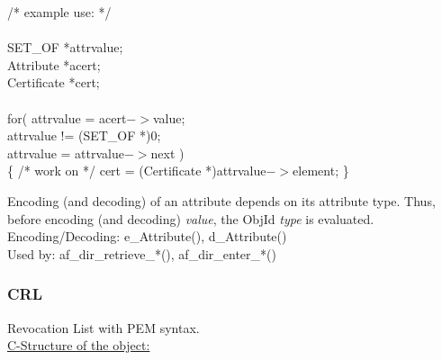 {\small
\btab
\1 /* example use: */   \\ \\
\2      SET\_OF     \2   *attrvalue; \\
\2      Attribute   \2   *acert;     \\
\2      Certificate \2   *cert;      \\ \\
\2      for( attrvalue = acert$->$value;  \\
\3         attrvalue != (SET\_OF *)0;  \\
\3         attrvalue = attrvalue$->$next ) \\
\2         \{ /* work on */ cert = (Certificate *)attrvalue$->$element; \} \\
\etab
}

Encoding (and decoding) of an attribute depends on its attribute type.
Thus, before encoding (and decoding) {\em value},
the ObjId {\em type} is evaluated.
\\
Encoding/Decoding: e\_Attribute(), d\_Attribute() \\
Used by: af\_dir\_retrieve\_*(), af\_dir\_enter\_*()

\subsubsection{CRL}
Revocation List with PEM syntax. \\
\underline{C-Structure of the object:}


